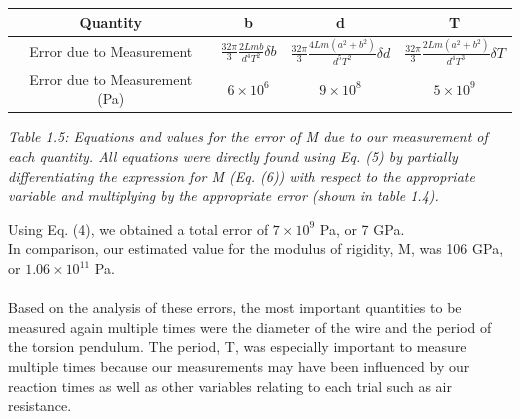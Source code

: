 \documentclass[leqno]{article}
\begin{document}
\begin{tabular}{|c|c|c|c|}
\hline
Quantity & b & d & T\\
\hline
Error due to Measurement & $\frac{32\pi}{3}\frac{2Lmb}{d^4 T^2}\delta b$ & $\frac{32\pi}{3}\frac{4Lm(a^2+b^2)}{d^5 T^2}\delta d$ & $\frac{32\pi}{3}\frac{2Lm(a^2+b^2)}{d^4 T^3}\delta T$\\
\hline
Error due to Measurement (Pa)& $6\times10^6$ & $9\times10^8$ & $5\times10^9$\\
\hline
\end{tabular}
\begin{flushleft}
\textit{\small Table 1.5: Equations and values for the error of M due to our measurement of each quantity.  All equations were directly found using Eq. (5) by partially differentiating the expression for M (Eq. (6)) with respect to the appropriate variable and multiplying by the appropriate error (shown in table 1.4).}
\end{flushleft}
Using Eq. (4), we obtained a total error of $7 \times 10^9$ Pa, or 7 GPa.\\
In comparison, our estimated value for the modulus of rigidity, M, was 106 GPa, or $1.06\times10^{11}$ Pa.\\\\
Based on the analysis of these errors, the most important quantities to be measured again multiple times were the diameter of the wire and the period of the torsion pendulum.  The period, T, was especially important to measure multiple times because our measurements may have been influenced by our reaction times as well as other variables relating to each trial such as air resistance.
\end{document}
